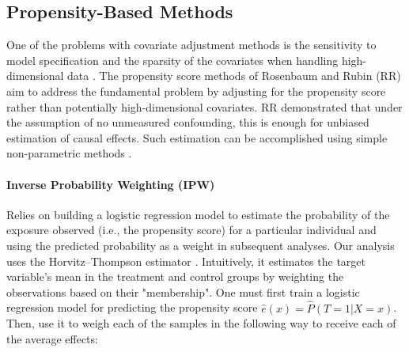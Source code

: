 \documentclass{article}
\newcommand{\gur}[1]{{\color{teal}{Gur: #1}}}
\begin{document}
\gur{Bootstrap}

\subsection{Propensity-Based Methods}

One of the problems with covariate adjustment methods is the sensitivity to model specification and the sparsity of the covariates when handling high-dimensional data \citep{zhao2020propensity}. The propensity score methods of Rosenbaum and Rubin (RR) aim to address the fundamental problem by adjusting for the propensity score rather than potentially high-dimensional covariates. RR demonstrated that under the assumption of no unmeasured confounding, this is enough for unbiased estimation of causal effects. Such estimation can be accomplished using simple non-parametric methods \citep{abdia2017propensity}.

\paragraph{Inverse Probability Weighting (IPW)} Relies on building a logistic regression model to estimate the probability of the exposure observed (i.e., the propensity score) for a particular individual and using the predicted probability as a weight in subsequent analyses. Our analysis uses the Horvitz–Thompson estimator \citep{horvitz1952generalization}. Intuitively, it estimates the target variable's mean in the treatment and control groups by weighting the observations based on their "membership". One must first train a logistic regression model for predicting the propensity score $\hat e(x) = \hat P(T=1 | X=x)$. Then, use it to weigh each of the samples in the following way to receive each of the average effects:
\end{document}
